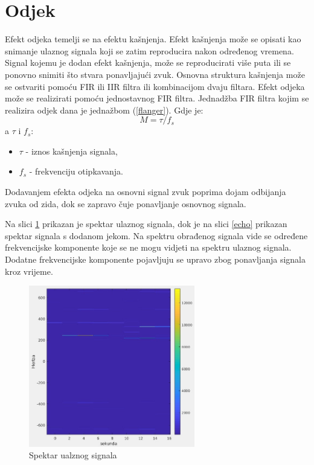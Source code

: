 \documentclass[conference]{IEEEtran}
\begin{document}
\section{Odjek}

Efekt odjeka temelji se na efektu kašnjenja. Efekt kašnjenja može se opisati kao snimanje ulaznog signala
koji se zatim reproducira nakon određenog vremena. Signal kojemu je dodan efekt kašnjenja, može se
reproducirati više puta ili se ponovno snimiti što stvara ponavljajući zvuk. Osnovna struktura kašnjenja može
se ostvariti pomoću FIR ili IIR filtra ili kombinacijom dvaju filtara. Efekt odjeka može se realizirati pomoću
jednostavnog FIR filtra. Jednadžba FIR filtra kojim se realizira odjek dana je jednažbom (\ref{flanger}).
Gdje je: \[M = \tau/f_{s}\]
a $\tau$ i $f_{s}$:
 \begin{itemize}
   \item{$\tau$ - iznos kašnjenja signala,}
   \item{$f_{s}$ - frekvenciju otipkavanja.}
 \end{itemize}
Dodavanjem efekta odjeka na osnovni signal zvuk poprima dojam odbijanja zvuka od zida, dok se zapravo čuje
ponavljanje osnovnog signala.

Na slici \ref{echo_ulaz} prikazan je spektar ulaznog signala, dok je na slici \ref{echo} prikazan spektar
signala s dodanom jekom. Na spektru obrađenog
signala vide se određene frekvencijske komponente koje se ne mogu vidjeti na spektru ulaznog signala.
Dodatne frekvencijske komponente pojavljuju se upravo zbog ponavljanja signala kroz vrijeme.

\begin{figure}[H]
  \centerline{\includegraphics[height=200pt]{slike/echo_ulaz.jpeg}}
  \caption{Spektar ualznog signala}
  \label{echo_ulaz}
\end{figure}
\end{document}
